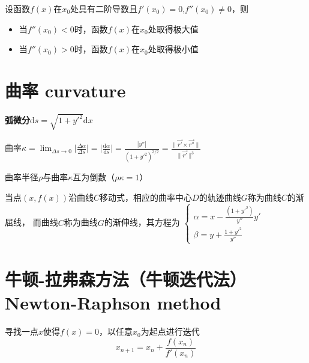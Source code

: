 \documentclass[UTF8]{ctexart}
\newcommand{\D}{\text{d}}
\begin{document}
\bigskip

设函数$f(x)$在$x_0$处具有二阶导数且$f'(x_0)=0$,$f''(x_0)\ne0$，则
\begin{itemize}
  \item 当$f''(x_0)<0$时，函数$f(x)$在$x_0$处取得极大值
  \item 当$f''(x_0)>0$时，函数$f(x)$在$x_0$处取得极小值
\end{itemize}

\bigskip
\bigskip

\section*{曲率 curvature}

\bigskip

\textbf{弧微分$\D s=\sqrt{1+y'^2}\D x$}

曲率$ \displaystyle\kappa
=\lim_{\Delta s\to0}\big|\frac{\Delta\alpha}{\Delta s}\big|
=\big|\frac{\D\alpha}{\D s}\big|
=\frac{|y''|}{(1+y'^2)^{3/2}}
=\frac{\|\vec{r'}\times\vec{r''}\|}{\|\vec{r'}\|^3}$

曲率半径$\rho$与曲率$\kappa$互为倒数（$\rho\kappa=1$）

当点$(x,f(x))$沿曲线$C$移动式，相应的曲率中心$D$的轨迹曲线$G$称为曲线$C$的渐屈线，
而曲线$C$称为曲线$G$的渐伸线，其方程为
$\displaystyle\begin{cases}
\alpha=x-\frac{(1+y'^2)}{y''}y'\\
\beta=y+\frac{1+y'^2}{y''}
\end{cases}$
\bigskip
\bigskip

\section*{牛顿-拉弗森方法（牛顿迭代法） Newton-Raphson method}

\bigskip

寻找一点$x$使得$f(x)=0$，以任意$x_0$为起点进行迭代
\[ x_{n+1}=x_n+\frac{f(x_n)}{f'(x_n)} \]
\end{document}
